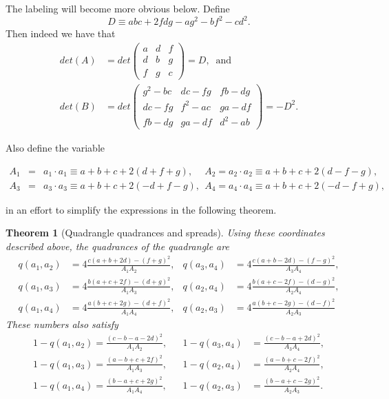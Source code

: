\documentclass{unswthesis}
\newtheorem{theorem}{Theorem}
\begin{document}
The labeling will become more obvious below. Define 
\begin{equation*}
D\equiv abc+2fdg-ag^{2}-bf^{2}-cd^{2}. 
\end{equation*}%
Then indeed we have that 
\begin{align*}
det(A)& =det%
\begin{pmatrix}
a & d & f \\ 
d & b & g \\ 
f & g & c%
\end{pmatrix}%
=D,\;\;\text{and} \\
det(B)& =det%
\begin{pmatrix}
g^{2}-bc & dc-fg & fb-dg \\ 
dc-fg & f^{2}-ac & ga-df \\ 
fb-dg & ga-df & d^{2}-ab%
\end{pmatrix}%
=-D^{2}.
\end{align*}

Also define the variable

\begin{eqnarray*}
A_{1} &=&a_{1}\cdot a_{1}\equiv a+b+c+2\left( d+f+g\right) ,~\quad
A_{2}=a_{2}\cdot a_{2}\equiv a+b+c+2\left( d-f-g\right) ,~~ \\
A_{3} &=&a_{3}\cdot a_{3}\equiv a+b+c+2\left( -d+f-g\right)
,~~A_{4}=a_{4}\cdot a_{4}\equiv a+b+c+2(-d-f+g),
\end{eqnarray*}

in an effort to simplify the expressions in the following theorem.

\begin{theorem}[Quadrangle quadrances and spreads]
Using these coordinates described above, the quadrances of the quadrangle
are 
\begin{align*}
q(a_{1},a_{2})& =4\frac{c(a+b+2d)-(f+g)^{2}}{A_{1}A_{2}}, & q(a_{3},a_{4})&
=4\frac{c(a+b-2d)-(f-g)^{2}}{A_{3}A_{4}}, \\
q(a_{1},a_{3})& =4\frac{b(a+c+2f)-(d+g)^{2}}{A_{1}A_{3}}, & q(a_{2},a_{4})&
=4\frac{b(a+c-2f)-(d-g)^{2}}{A_{2}A_{4}}, \\
q(a_{1},a_{4})& =4\frac{a(b+c+2g)-(d+f)^{2}}{A_{1}A_{4}}, & q(a_{2},a_{3})&
=4\frac{a(b+c-2g)-(d-f)^{2}}{A_{2}A_{3}}
\end{align*}%
These numbers also satisfy 
\begin{align*}
1-q(a_{1},a_{2})=\frac{(c-b-a-2d)^{2}}{A_{1}A_{2}},& & 1-q(a_{3},a_{4})& =%
\frac{(c-b-a+2d)^{2}}{A_{3}A_{4}}, \\
1-q(a_{1},a_{3})=\frac{(a-b+c+2f)^{2}}{A_{1}A_{3}},& & 1-q(a_{2},a_{4})& =%
\frac{(a-b+c-2f)^{2}}{A_{2}A_{4}}, \\
1-q(a_{1},a_{4})=\frac{(b-a+c+2g)^{2}}{A_{1}A_{4}},& & 1-q(a_{2},a_{3})& =%
\frac{(b-a+c-2g)^{2}}{A_{2}A_{3}}.
\end{align*}
\end{theorem}
\end{document}
